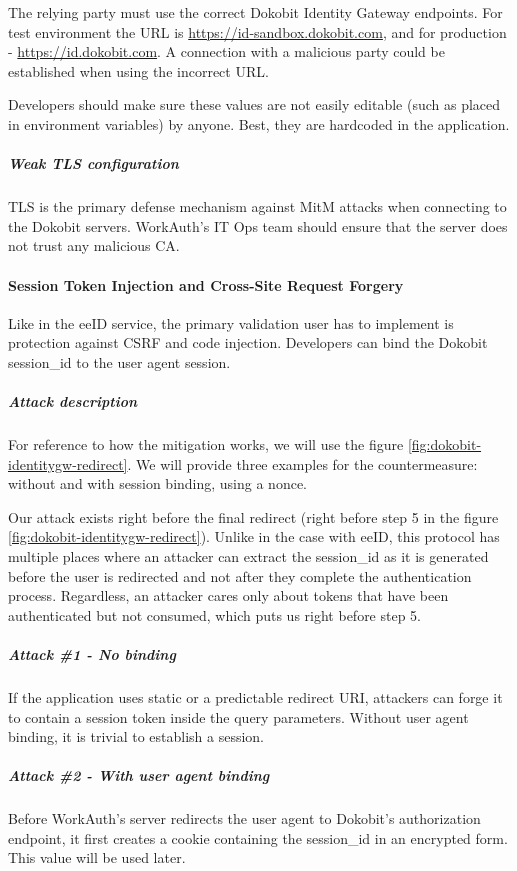 The relying party must use the correct Dokobit Identity Gateway endpoints. For test environment the URL is \url{https://id-sandbox.dokobit.com}, and for production - \url{https://id.dokobit.com}. A connection with a malicious party could be established when using the incorrect URL.

Developers should make sure these values are not easily editable (such as placed in environment variables) by anyone. Best, they are hardcoded in the application.

\subparagraph{Weak TLS configuration}

TLS is the primary defense mechanism against MitM attacks when connecting to the Dokobit servers. WorkAuth's IT Ops team should ensure that the server does not trust any malicious CA.

\paragraph{Session Token Injection and Cross-Site Request Forgery}

Like in the eeID service, the primary validation user has to implement is protection against CSRF and code injection. Developers can bind the Dokobit session\_id to the user agent session.

\subparagraph{Attack description}

For reference to how the mitigation works, we will use the figure \ref{fig:dokobit-identitygw-redirect}. We will provide three examples for the countermeasure: without and with session binding, using a nonce.

Our attack exists right before the final redirect (right before step 5 in the figure \ref{fig:dokobit-identitygw-redirect}). Unlike in the case with eeID, this protocol has multiple places where an attacker can extract the session\_id as it is generated before the user is redirected and not after they complete the authentication process. Regardless, an attacker cares only about tokens that have been authenticated but not consumed, which puts us right before step 5.

\subparagraph{Attack \#1 - No binding}

If the application uses static or a predictable redirect URI, attackers can forge it to contain a session token inside the query parameters. Without user agent binding, it is trivial to establish a session.

\subparagraph{Attack \#2 - With user agent binding}

Before WorkAuth's server redirects the user agent to Dokobit's authorization endpoint, it first creates a cookie containing the session\_id in an encrypted form. This value will be used later.

